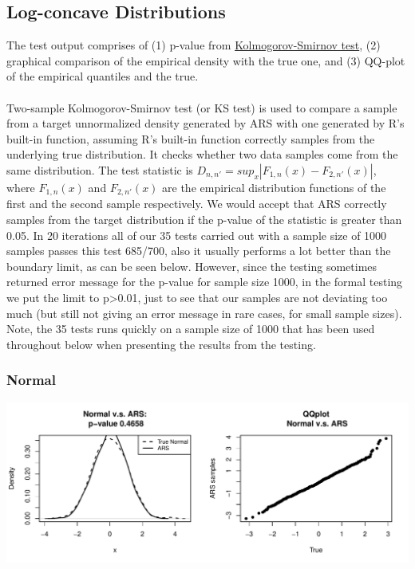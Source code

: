 \documentclass{article}\usepackage[]{graphicx}\usepackage[]{color}
\makeatletter
\def\maxwidth{ %
  \ifdim\Gin@nat@width>\linewidth
    \linewidth
  \else
    \Gin@nat@width
  \fi
}
\newenvironment{knitrout}{}{} %
\makeatother
\begin{document}
\subsection{Log-concave Distributions}
The test output comprises of (1) p-value from 
\href{https://en.wikipedia.org/wiki/Kolmogorov\%E2\%80\%93Smirnov_test}{Kolmogorov-Smirnov test}, 
(2) graphical comparison of the empirical density with the true one,
and (3) QQ-plot of the empirical quantiles and the true.\\
\\
Two-sample Kolmogorov-Smirnov test (or KS test) is used to compare a sample from 
a target unnormalized density generated by ARS with one generated by R's built-in 
function, assuming R's built-in function correctly samples from the underlying true
distribution. It checks whether two data samples come from the same distribution. The
test statistic is $D_{n, n'} = sup_x|F_{1,n}(x) - F_{2,n'}(x)|$, where
$F_{1,n}(x)$ and $F_{2,n'}(x)$ are  the empirical distribution functions of the 
first and the second sample respectively. We would accept that ARS correctly samples
from the target distribution if the p-value of the statistic is greater than 0.05. In 20 iterations all of our 35 tests carried out with a sample size of 1000 samples passes this test 685/700, also it usually performs a lot better than the boundary limit, as can be seen below. However, since the testing sometimes returned error message for the p-value for sample size 1000, in the formal testing we put the limit to p>0.01, just to see that our samples are not deviating too much (but still not giving an error message in rare cases, for small sample sizes). \\
Note, the 35 tests runs quickly on a sample size of 1000 that has been used throughout below when presenting the results from the testing.

\subsubsection{Normal}
\begin{knitrout}
\color{fgcolor}
\includegraphics[width=\maxwidth]{figure/normal-1} 

\end{knitrout}
\end{document}
